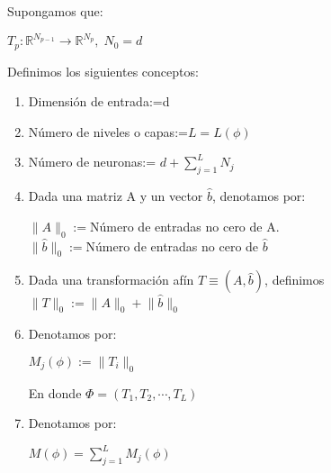 \documentclass[12pt,a4paper]{book}
\providecommand{\norm}[1]{\lVert#1\rVert}
\begin{document}
\begin{definicion}{}{}
Supongamos que:
\begin{center}
$T_{p}:\mathbb{R}^{N_{p-1}}\rightarrow\mathbb{R}^{N_{p}},\; N_{0}=d$
\end{center}
Definimos los siguientes conceptos:
\begin{enumerate}
\item Dimensión de entrada:=d
\item Número de niveles o capas:=$L=L(\phi)$
\item Número de neuronas:= $d+\sum_{j=1}^{L}N_{j}$
\item Dada una matriz A y un vector $\widehat{b}$, denotamos por:
\begin{center}
$\norm{A}_{0}:=$Número de entradas no cero de A.\\
$\norm{\widehat{b}}_{0}:=$Número de entradas no cero de $\widehat{b}$
\end{center}
\item Dada una transformación afín $T\equiv (A,\widehat{b})$, definimos $\norm{T}_{0}:=\norm{A}_{0}+\norm{\widehat{b}}_{0}$
\item Denotamos por:
\begin{center}
$M_{j}(\phi):=\norm{T_{i}}_{0}$
\end{center}
En donde $\Phi=(T_{1},T_{2},\cdots,T_{L})$
\item Denotamos por:
\begin{center}
$M(\phi)=\sum_{j=1}^{L}M_{j}(\phi)$
\end{center}
\end{enumerate}
\end{definicion}
\end{document}
